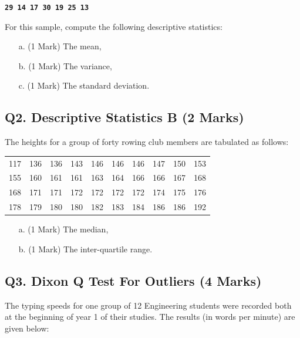 \documentclass[a4paper,12pt]{article}
\begin{document}
\begin{center}
	\textbf{\texttt{29 14 17 30 19 25 13}}
\end{center}

\noindent For this sample, compute the following descriptive statistics:
\begin{itemize}
	\item[a.] (1 Mark) The mean,
	\item[b.] (1 Mark) The variance,
	\item[c.] (1 Mark) The standard deviation.
\end{itemize}

\subsection*{Q2. Descriptive Statistics B (2 Marks)} %
The heights for a group of forty rowing club members are tabulated as follows:

\begin{table}[ht]
	\begin{center}
		\begin{tabular}{|rrrrrrrrrr|}
			
			\hline
			117& 136& 136& 143& 146& 146& 146& 147& 150& 153\\
			155& 160& 161& 161& 163& 164& 166& 166& 167& 168\\
			168& 171& 171& 172& 172& 172& 172& 174& 175& 176\\
			178& 179& 180& 180& 182& 183& 184& 186& 186& 192\\
			\hline
		\end{tabular}
	\end{center}
\end{table}
\vspace{-0.5cm}
\begin{itemize}
	\item[a.] (1 Mark) The median,
	\item[b.] (1 Mark) The inter-quartile range.
\end{itemize}
\subsection*{Q3. Dixon Q Test For Outliers (4 Marks)}

The typing speeds for one group of 12 Engineering students were recorded both at the beginning of year 1 of their studies. The results (in words per minute) are given below:
\end{document}
